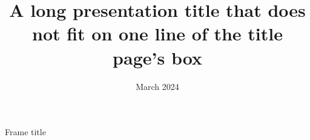 \documentclass[10pt]{beamer}
\title[Short]{A long presentation title that does not fit on one line of the title page's box}
\date{March 2024}
\begin{document}
\frame{\maketitle}
\begin{frame}{Frame title}
\titlepage
\end{frame}
\end{document}
